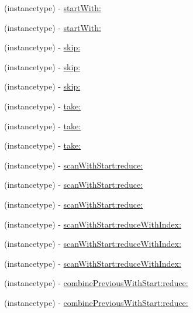 \begin{DoxyCompactItemize}
\item 
(instancetype) -\/ \mbox{\hyperlink{interface_r_a_c_stream_a2f255fad695085b91a1ebc1e0a78c865}{start\+With\+:}}
\item 
(instancetype) -\/ \mbox{\hyperlink{interface_r_a_c_stream_a2f255fad695085b91a1ebc1e0a78c865}{start\+With\+:}}
\item 
(instancetype) -\/ \mbox{\hyperlink{interface_r_a_c_stream_a1525f1607d8ff7f04a0afc1a5193436a}{skip\+:}}
\item 
(instancetype) -\/ \mbox{\hyperlink{interface_r_a_c_stream_a1525f1607d8ff7f04a0afc1a5193436a}{skip\+:}}
\item 
(instancetype) -\/ \mbox{\hyperlink{interface_r_a_c_stream_a1525f1607d8ff7f04a0afc1a5193436a}{skip\+:}}
\item 
(instancetype) -\/ \mbox{\hyperlink{interface_r_a_c_stream_af0264b38dc4acd9334d2e42b1ce21b05}{take\+:}}
\item 
(instancetype) -\/ \mbox{\hyperlink{interface_r_a_c_stream_af0264b38dc4acd9334d2e42b1ce21b05}{take\+:}}
\item 
(instancetype) -\/ \mbox{\hyperlink{interface_r_a_c_stream_af0264b38dc4acd9334d2e42b1ce21b05}{take\+:}}
\item 
(instancetype) -\/ \mbox{\hyperlink{interface_r_a_c_stream_aa86990e9bc4cbc3dff2815f56b907b41}{scan\+With\+Start\+:reduce\+:}}
\item 
(instancetype) -\/ \mbox{\hyperlink{interface_r_a_c_stream_aa86990e9bc4cbc3dff2815f56b907b41}{scan\+With\+Start\+:reduce\+:}}
\item 
(instancetype) -\/ \mbox{\hyperlink{interface_r_a_c_stream_aa86990e9bc4cbc3dff2815f56b907b41}{scan\+With\+Start\+:reduce\+:}}
\item 
(instancetype) -\/ \mbox{\hyperlink{interface_r_a_c_stream_a69cedeb6e96a6d4154f2256fdcbe27b1}{scan\+With\+Start\+:reduce\+With\+Index\+:}}
\item 
(instancetype) -\/ \mbox{\hyperlink{interface_r_a_c_stream_a69cedeb6e96a6d4154f2256fdcbe27b1}{scan\+With\+Start\+:reduce\+With\+Index\+:}}
\item 
(instancetype) -\/ \mbox{\hyperlink{interface_r_a_c_stream_a69cedeb6e96a6d4154f2256fdcbe27b1}{scan\+With\+Start\+:reduce\+With\+Index\+:}}
\item 
(instancetype) -\/ \mbox{\hyperlink{interface_r_a_c_stream_a698f6ef68be8d3cb34f9be6efaaa5af7}{combine\+Previous\+With\+Start\+:reduce\+:}}
\item 
(instancetype) -\/ \mbox{\hyperlink{interface_r_a_c_stream_a698f6ef68be8d3cb34f9be6efaaa5af7}{combine\+Previous\+With\+Start\+:reduce\+:}}

\end{DoxyCompactItemize}
